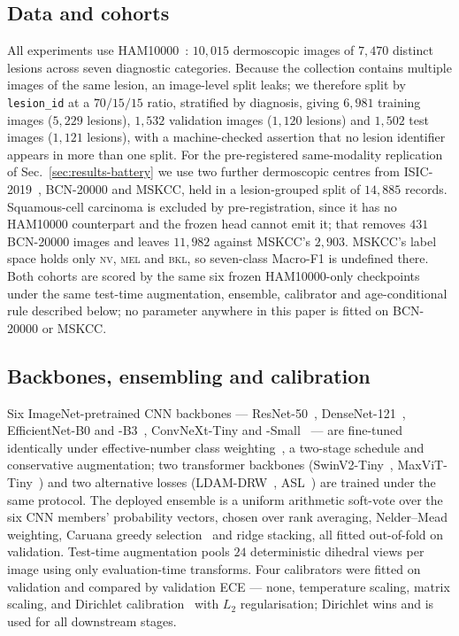\documentclass[journal]{IEEEtran}
\begin{document}
\subsection{Data and cohorts}
All experiments use HAM10000~\cite{tschandl2018ham10000}: $10{,}015$ dermoscopic images of
$7{,}470$ distinct lesions across seven diagnostic categories. Because the collection contains
multiple images of the same lesion, an image-level split leaks; we therefore split by
\texttt{lesion\_id} at a $70/15/15$ ratio, stratified by diagnosis, giving $6{,}981$ training
images ($5{,}229$ lesions), $1{,}532$ validation images ($1{,}120$ lesions) and $1{,}502$ test
images ($1{,}121$ lesions), with a machine-checked assertion that no lesion identifier appears
in more than one split. For the pre-registered same-modality replication of
Sec.~\ref{sec:results-battery} we use two further dermoscopic centres from
ISIC-2019~\cite{combalia2019bcn20000,codella2018isic}, BCN-20000 and MSKCC, held in a
lesion-grouped split of $14{,}885$ records. Squamous-cell carcinoma is excluded by
pre-registration, since it has no HAM10000 counterpart and the frozen head cannot emit it;
that removes $431$ BCN-20000 images and leaves $11{,}982$ against MSKCC's $2{,}903$. MSKCC's
label space holds only \textsc{nv}, \textsc{mel} and \textsc{bkl}, so seven-class Macro-F1 is
undefined there. Both cohorts are scored by the same six frozen HAM10000-only checkpoints under
the same test-time augmentation, ensemble, calibrator and age-conditional rule described below;
no parameter anywhere in this paper is fitted on BCN-20000 or MSKCC.

\subsection{Backbones, ensembling and calibration}
Six ImageNet-pretrained CNN backbones --- ResNet-50~\cite{he2016resnet},
DenseNet-121~\cite{huang2017densenet}, EfficientNet-B0 and
-B3~\cite{tan2019efficientnet}, ConvNeXt-Tiny and -Small~\cite{liu2022convnext} --- are
fine-tuned identically under effective-number class weighting~\cite{cui2019classbalanced}, a
two-stage schedule and conservative augmentation; two transformer backbones
(SwinV2-Tiny~\cite{liu2022swinv2}, MaxViT-Tiny~\cite{tu2022maxvit}) and two alternative losses
(LDAM-DRW~\cite{cao2019ldam}, ASL~\cite{ridnik2021asl}) are trained under the same protocol.
The deployed ensemble is a uniform arithmetic soft-vote over the six CNN members' probability
vectors, chosen over rank averaging, Nelder--Mead weighting, Caruana greedy
selection~\cite{caruana2004ensemble} and ridge stacking, all fitted out-of-fold on validation.
Test-time augmentation pools $24$ deterministic dihedral views per image using only
evaluation-time transforms. Four calibrators were fitted on validation and compared by
validation ECE --- none, temperature scaling, matrix scaling, and Dirichlet
calibration~\cite{kull2019dirichlet} with $L_2$ regularisation; Dirichlet wins and is used for
all downstream stages.
\end{document}
